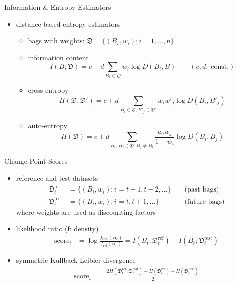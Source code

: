 \documentclass[fleqn,aspectratio=1610]{beamer}
\begin{document}
\begin{frame}[label={sec:org58b9d4b}]{Information \& Entropy Estimators}
\begin{itemize}
\item distance-based entropy estimators

\nocite{HinoMurata2013}
\begin{itemize}
\item bags with weights: \(\mathfrak{D}=\{(B_i,w_i);i=1,\dotsc,n\}\)
\item information content
\begin{equation}
  I(B;\mathfrak{D})
  =c+d\sum_{B_i\in\mathfrak{D}}w_i\log D(B_i,B)
  \qquad(c,d:\;\text{const.})
\end{equation}
\item cross-entropy
\begin{equation}
  H(\mathfrak{D},\mathfrak{D}')
  =c+d\sum_{B_i\in\mathfrak{D},B'_j\in\mathfrak{D}'}
  w_iw'_j\log D(B_i,B'_j)
\end{equation}
\item auto-entropy
\begin{equation}
  H(\mathfrak{D})
  =c+d\sum_{B_i,B_j\in\mathfrak{D},B_j\not=B_i}
  \frac{w_iw_j}{1-w_i}\log D(B_i,B_j)
\end{equation}
\end{itemize}
\end{itemize}
\end{frame}

\begin{frame}[label={sec:orge181181}]{Change-Point Scores}
\begin{itemize}
\item reference and test datasets
\begin{align}
 \mathfrak{D}_{t}^{\mathrm{ref}}
 &=\{(B_i,w_i);i=t-1,t-2,\dotsc\}
  &&\text{ (past bags)}
 \\
 \mathfrak{D}_{t}^{\mathrm{test}}
 &=\{(B_i,w_i);i=t,t+1,\dotsc\}
  &&\text{ (future bags)}
\end{align}
where weights are used as discounting factors
\item likelihood ratio (f: density)
\begin{align}
 \mathrm{score}_{t}
 &=\log\frac{f_{\mathrm{test}}(B_t)}{f_{\mathrm{ref}}(B_t)}
 =I(B_t;\mathfrak{D}_{t}^{\mathrm{ref}})
 -I(B_t;\mathfrak{D}_{t}^{\mathrm{test}})
\end{align}
\item symmetric Kullback-Leibler divergence
\begin{align}
  \mathrm{score}_{t}
  &=\frac{2H(\mathfrak{D}_{t}^{\mathrm{ref}},\mathfrak{D}_{t}^{\mathrm{test}})
   -H(\mathfrak{D}_{t}^{\mathrm{ref}})-H(\mathfrak{D}_{t}^{\mathrm{test}})}{2}
\end{align}
\end{itemize}
\end{frame}
\end{document}
